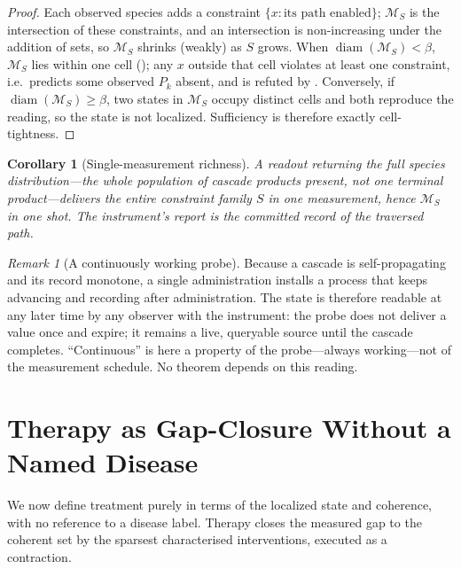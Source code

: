 \documentclass[11pt,a4paper]{article}
\theoremstyle{cfcthm}
\newtheorem{corollary}[theorem]{Corollary}
\theoremstyle{definition}
\theoremstyle{remark}
\newtheorem{remark}[theorem]{Remark}
\newcommand{\Man}{\mathcal{M}}          %
\newcommand{\st}{x}                     %
\newcommand{\flo}{\beta}                %
\newcommand{\set}[1]{\{#1\}}
\newcommand{\diam}{\operatorname{diam}}
\begin{document}
\begin{proof}
Each observed species adds a constraint $\set{\st:\text{its path enabled}}$;
$\Man_S$ is the intersection of these constraints, and an intersection is
non-increasing under the addition of sets, so $\Man_S$ shrinks (weakly) as $S$
grows. When $\diam(\Man_S)<\flo$, $\Man_S$ lies within one cell
(); any $\st$ outside that cell violates at least one constraint,
i.e.\ predicts some observed $P_k$ absent, and is refuted by
. Conversely, if $\diam(\Man_S)\ge\flo$, two states in
$\Man_S$ occupy distinct cells and both reproduce the reading, so the state is
not localized. Sufficiency is therefore exactly cell-tightness.
\end{proof}

\begin{corollary}[Single-measurement richness]
\label{cor:single}
A readout returning the full species distribution---the whole population of
cascade products present, not one terminal product---delivers the entire
constraint family $S$ in one measurement, hence $\Man_S$ in one shot. The
instrument's report \emph{is} the committed record of the traversed path.
\end{corollary}

\begin{remark}[A continuously working probe]
\label{rem:continuous}
Because a cascade is self-propagating and its record monotone, a single
administration installs a process that keeps advancing and recording after
administration. The state is therefore readable at any later time by any
observer with the instrument: the probe does not deliver a value once and
expire; it remains a live, queryable source until the cascade completes.
``Continuous'' is here a property of the probe---always working---not of the
measurement schedule. No theorem depends on this reading.
\end{remark}

\section{Therapy as Gap-Closure Without a Named Disease}
\label{sec:therapy}

We now define treatment purely in terms of the localized state and coherence,
with no reference to a disease label. Therapy closes the measured gap to the
coherent set by the sparsest characterised interventions, executed as a
contraction.
\end{document}

